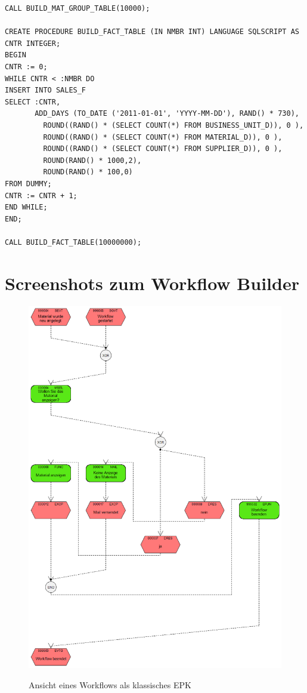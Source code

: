 \begin{lstlisting}
CALL BUILD_MAT_GROUP_TABLE(10000);
 
CREATE PROCEDURE BUILD_FACT_TABLE (IN NMBR INT) LANGUAGE SQLSCRIPT AS
CNTR INTEGER;
BEGIN
CNTR := 0;
WHILE CNTR < :NMBR DO
INSERT INTO SALES_F
SELECT :CNTR,
       ADD_DAYS (TO_DATE ('2011-01-01', 'YYYY-MM-DD'), RAND() * 730),
         ROUND((RAND() * (SELECT COUNT(*) FROM BUSINESS_UNIT_D)), 0 ),
         ROUND((RAND() * (SELECT COUNT(*) FROM MATERIAL_D)), 0 ),
         ROUND((RAND() * (SELECT COUNT(*) FROM SUPPLIER_D)), 0 ),
         ROUND(RAND() * 1000,2),
         ROUND(RAND() * 100,0)
FROM DUMMY;      
CNTR := CNTR + 1;
END WHILE;
END;
 
CALL BUILD_FACT_TABLE(10000000);
\end{lstlisting}

\section{Screenshots zum Workflow Builder}
\begin{figure}[H]
	\begin{center}
	\includegraphics[height=0.9\textheight]{grafiken/wf-builder_view-classicepc.png}
	\caption{Ansicht eines Workflows als klassisches EPK}
	\vspace{-10pt}
	\label{abb:workflow-view-classicepc}
	\end{center}
\end{figure}

